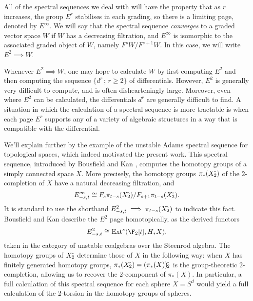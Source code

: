 \documentclass[11pt]{article}
\theoremstyle{plain}
\begin{document}
All of the spectral sequences we deal with will have the property that as $r$ increases, the group $E^r$ stabilises in each grading, so there is a limiting page, denoted by $E^\infty$. We will say that the spectral sequence \emph{converges} to a graded vector space $W$ if $W$ has a decreasing filtration, and $E^\infty$ is isomorphic to the associated graded object of $W$, namely $F^sW/F^{s+1}W$. In this case, we will write $E^2\implies W$.

Whenever $E^2\implies W$, one may hope to calculate $W$ by first computing $E^2$ and then computing the sequence $\{d^r\,;\,r\geq2\}$ of differentials. However, $E^2$ is generally very difficult to compute, and is often dishearteningly large. Moreover, even where $E^2$ can be calculated, the differentials $d^r$ are generally difficult to find.
A situation in which the calculation of a spectral sequence is more tractable is when each page $E^r$ supports any of a variety of algebraic structures in a way that is compatible with the differential.

We'll explain further by the example of the unstable Adams spectral sequence for topological spaces, which indeed motivated the present work. This spectral sequence, introduced by Bousfield and Kan \cite{BousKanSSeq.pdf}, computes the homotopy groups of a simply connected space $X$. More precisely, the homotopy groups $\pi_*(X{\hat{\,}_\textup{\!\!2}})$ of the $2$-completion of $X$ have a natural decreasing filtration, and%
\[E^\infty_{-s,t}\cong F_s\pi_{t-s}(X{\hat{\,}_\textup{\!\!2}})/F_{s+1}\pi_{t-s}(X{\hat{\,}_\textup{\!\!2}}).\]
It is standard to use the shorthand $E^2_{-s,t}\implies \pi_{t-s}(X{\hat{\,}_\textup{\!\!2}})$ to indicate this fact. Bousfield and Kan describe the $E^2$ page homotopically, as the derived functors
\[E^2_{-s,t}\cong \Ext^s(\F_2[t],H_*X),\]
taken in the category of unstable coalgebras over the Steenrod algebra. The homotopy groups of $X{\hat{\,}_\textup{\!\!2}}$ determine those of $X$ in the following way: when $X$ has finitely generated homotopy groups, $\pi_*(X{\hat{\,}_\textup{\!\!2}})=(\pi_*(X)){\hat{\,}_\textup{\!\!2}}$ is the group-theoretic $2$-completion, allowing us to recover the $2$-component of $\pi_*(X)$. In particular, a full calculation of this spectral sequence for each sphere $X=S^d$ would yield a full calculation of the 2-torsion in the homotopy groups of spheres.
\end{document}
